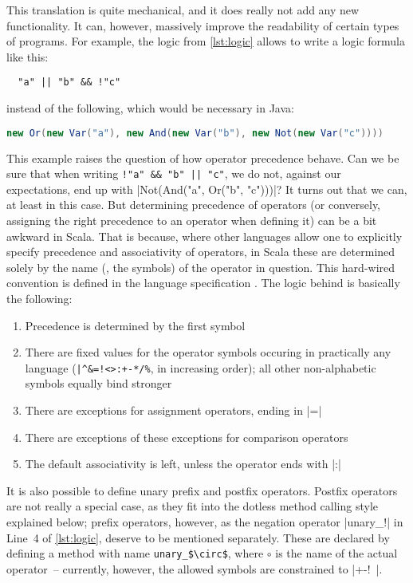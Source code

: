 This translation is quite mechanical, and it does really not add any new functionality. It can,
however, massively improve the readability of certain types of programs. For example, the logic
\dsl{} from \autoref{lst:logic} allows to write a logic formula like this:
\begin{lstlisting}
  "a" || "b" && !"c"
\end{lstlisting}
instead of the following, which would be necessary in Java:
\begin{lstlisting}[language=Java]
  new Or(new Var("a"), new And(new Var("b"), new Not(new Var("c"))))
\end{lstlisting}

This example raises the question of how operator precedence behave. Can we be sure that when writing
\lstinline[style=inline]{!"a" && "b" || "c"}, we do not, against our expectations, end up with %
|Not(And("a", Or("b", "c")))|? It turns out that we can, at least in this case. But determining
precedence of operators (or conversely, assigning the right precedence to an operator when defining
it) can be a bit awkward in Scala. That is because, where other languages allow one to explicitly
specify precedence and associativity of operators, in Scala these are determined solely by the name
(\ie, the symbols) of the operator in question. This hard-wired convention is defined in the
language specification \cite[][Chapter~6.12]{odersky2014:scala_spec}. The logic behind is basically
the following:
\begin{enumerate}\label{operators}
\item Precedence is determined by the first symbol
\item There are fixed values for the operator symbols occuring in practically any language
  (\lstinline[style=inline]{|^&=!<>:+-*/%}, in increasing order); all other non-alphabetic symbols
  equally bind stronger
\item There are exceptions for assignment operators, ending in |=|
\item There are exceptions of these exceptions for comparison operators
\item The default associativity is left, unless the operator ends with |:|
\end{enumerate}

It is also possible to define unary prefix and postfix operators. Postfix operators are not really a
special case, as they fit into the dotless method calling style explained below; prefix operators,
however, as the negation operator |unary_!| in Line~4 of \autoref{lst:logic}, deserve to be
mentioned separately. These are declared by defining a method with name
\lstinline[mathescape]|unary_$\circ$|, where \(\circ\) is the name of the actual operator~--
currently, however, the allowed symbols are constrained to |+-!~|.

